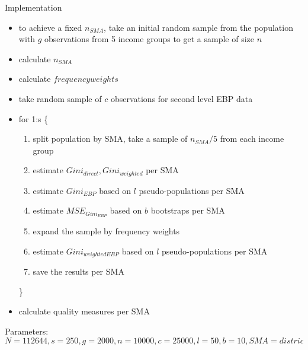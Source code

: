 %



\begin{column}{.3\linewidth}


\begin{block}{Implementation \Pheight}
\begin{itemize}

\item to achieve a fixed $n_{SMA}$, take an initial random sample from the population with $g$ observations from 5 income groups to get a sample of size $n$  
\item calculate $n_{SMA}$
\item calculate $frequency weights$
\item take random sample of $c$ observations for second level EBP data 
 
\item for 1:s \{
\begin{enumerate}  %
\item split population by SMA, take a sample of $n_{SMA} / 5$ from each income group
\item estimate $Gini_{direct}, Gini_{weighted}$ per SMA
\item estimate $Gini_{EBP}$  based on $l$ pseudo-populations per SMA
\item estimate $MSE_{Gini_{EBP}}$ based on $b$ bootstraps per SMA
\item expand the sample by frequency weights
\item estimate $Gini_{weighted EBP}$  based on $l$ pseudo-populations per SMA
\item save the results per SMA
\end{enumerate}
\}
 
\item calculate quality measures per SMA 
 \end{itemize}
Parameters: $N=112644, s=250, g=2000, n=10000, c=25000, l=50, b=10, SMA=district, i=5$
\end{block}



 
\end{column}



%

